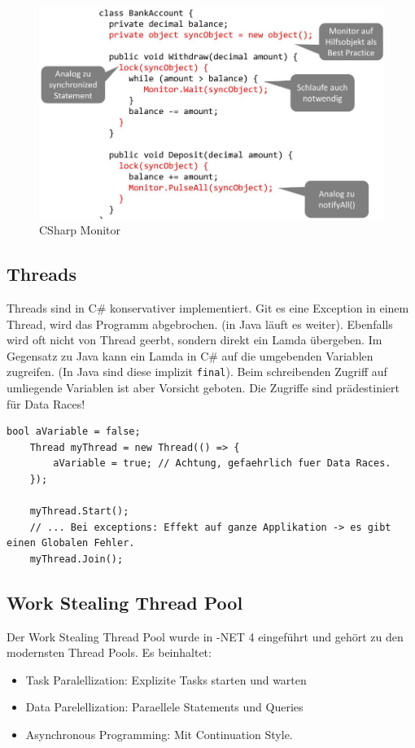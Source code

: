 \begin{figure}[h]
	\centering
	\includegraphics[width=0.7\linewidth]{img/csharp_monitor}
	\caption{CSharp Monitor}
	\label{fig:csharpmonitor}
\end{figure}

\subsection{Threads}
Threads sind in C\# konservativer implementiert. Git es eine Exception in einem Thread, wird das Programm abgebrochen. (in Java läuft es weiter). Ebenfalls wird oft nicht von Thread geerbt, sondern direkt ein Lamda übergeben. Im Gegensatz zu Java kann ein Lamda in C\# auf die umgebenden Variablen zugreifen. (In Java sind diese implizit \lstinline|final|). Beim schreibenden Zugriff auf umliegende Variablen ist aber Vorsicht geboten. Die Zugriffe sind prädestiniert für Data Races!


\begin{lstlisting}[language={[Sharp]C}]
	bool aVariable = false;
	Thread myThread = new Thread(() => {
		aVariable = true; // Achtung, gefaehrlich fuer Data Races.
	});
	
	myThread.Start();
	// ... Bei exceptions: Effekt auf ganze Applikation -> es gibt einen Globalen Fehler.
	myThread.Join();
\end{lstlisting}

\subsection{Work Stealing Thread Pool}
Der Work Stealing Thread Pool wurde in -NET 4 eingeführt und gehört zu den modernsten Thread Pools. Es beinhaltet:
\begin{itemize}
	\item Task Paralellization: Explizite Tasks starten und warten
	\item Data Parelellization: Paraellele Statements und Queries
	\item Asynchronous Programming: Mit Continuation Style.
\end{itemize}

